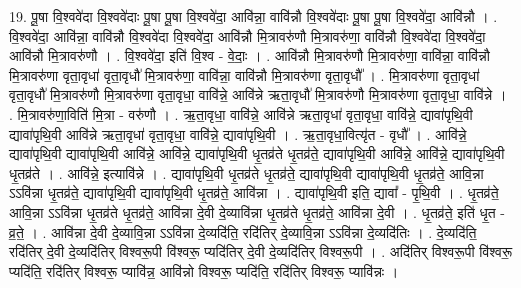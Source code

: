\documentclass[17pt]{extarticle}
\begin{document}
19. पू॒षा वि॒श्ववे॑दा वि॒श्ववे॑दाः पू॒षा पू॒षा वि॒श्ववे॑दा॒ आवि॑न्ना॒ वावि॑न्नौ वि॒श्ववे॑दाः पू॒षा पू॒षा वि॒श्ववे॑दा॒ आवि॑न्नौ । . वि॒श्ववे॑दा॒ आवि॑न्ना॒ वावि॑न्नौ वि॒श्ववे॑दा वि॒श्ववे॑दा॒ आवि॑न्नौ मि॒त्रावरु॑णौ मि॒त्रावरु॑णा॒ वावि॑न्नौ वि॒श्ववे॑दा वि॒श्ववे॑दा॒ आवि॑न्नौ मि॒त्रावरु॑णौ । . वि॒श्ववे॑दा॒ इति॑ वि॒श्व - वे॒दाः॒ । . आवि॑न्नौ मि॒त्रावरु॑णौ मि॒त्रावरु॑णा॒ वावि॑न्ना॒ वावि॑न्नौ मि॒त्रावरु॑णा वृता॒वृधा॑ वृता॒वृधौ॑ मि॒त्रावरु॑णा॒ वावि॑न्ना॒ वावि॑न्नौ मि॒त्रावरु॑णा वृता॒वृधौ᳚ । . मि॒त्रावरु॑णा वृता॒वृधा॑ वृता॒वृधौ॑ मि॒त्रावरु॑णौ मि॒त्रावरु॑णा वृता॒वृधा॒ वावि॑न्ने॒ आवि॑न्ने ऋता॒वृधौ॑ मि॒त्रावरु॑णौ मि॒त्रावरु॑णा वृता॒वृधा॒ वावि॑न्ने । . मि॒त्रावरु॑णा॒विति॑ मि॒त्रा - वरु॑णौ । . ऋ॒ता॒वृधा॒ वावि॑न्ने॒ आवि॑न्ने ऋता॒वृधा॑ वृता॒वृधा॒ वावि॑न्ने॒ द्यावा॑पृथि॒वी द्यावा॑पृथि॒वी आवि॑न्ने ऋता॒वृधा॑ वृता॒वृधा॒ वावि॑न्ने॒ द्यावा॑पृथि॒वी । . ऋ॒ता॒वृधा॒वित्यृ॑त - वृधौ᳚ । . आवि॑न्ने॒ द्यावा॑पृथि॒वी द्यावा॑पृथि॒वी आवि॑न्ने॒ आवि॑न्ने॒ द्यावा॑पृथि॒वी धृ॒तव्र॑ते धृ॒तव्र॑ते॒ द्यावा॑पृथि॒वी आवि॑न्ने॒ आवि॑न्ने॒ द्यावा॑पृथि॒वी धृ॒तव्र॑ते । . आवि॑न्ने॒ इत्यावि॑न्ने । . द्यावा॑पृथि॒वी धृ॒तव्र॑ते धृ॒तव्र॑ते॒ द्यावा॑पृथि॒वी द्यावा॑पृथि॒वी धृ॒तव्र॑ते॒ आवि॒न्ना ऽऽवि॑न्ना धृ॒तव्र॑ते॒ द्यावा॑पृथि॒वी द्यावा॑पृथि॒वी धृ॒तव्र॑ते॒ आवि॑न्ना । . द्यावा॑पृथि॒वी इति॒ द्यावा᳚ - पृ॒थि॒वी । . धृ॒तव्र॑ते॒ आवि॒न्ना ऽऽवि॑न्ना धृ॒तव्र॑ते धृ॒तव्र॑ते॒ आवि॑न्ना दे॒वी दे॒व्यावि॑न्ना धृ॒तव्र॑ते धृ॒तव्र॑ते॒ आवि॑न्ना दे॒वी । . धृ॒तव्र॑ते॒ इति॑ धृ॒त - व्र॒ते॒ । . आवि॑न्ना दे॒वी दे॒व्यावि॒न्ना ऽऽवि॑न्ना दे॒व्यदि॑ति॒ रदि॑तिर् दे॒व्यावि॒न्ना ऽऽवि॑न्ना दे॒व्यदि॑तिः । . दे॒व्यदि॑ति॒ रदि॑तिर् दे॒वी दे॒व्यदि॑तिर् विश्वरू॒पी वि॑श्वरू॒ प्यदि॑तिर् दे॒वी दे॒व्यदि॑तिर् विश्वरू॒पी । . अदि॑तिर् विश्वरू॒पी वि॑श्वरू॒ प्यदि॑ति॒ रदि॑तिर् विश्वरू॒ प्यावि॑न्न॒ आवि॑न्नो विश्वरू॒ प्यदि॑ति॒ रदि॑तिर् विश्वरू॒ प्यावि॑न्नः । \newline
\end{document}
